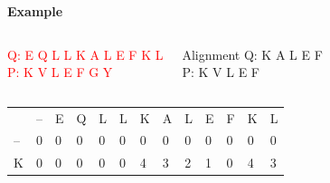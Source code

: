 \documentclass{bredelebeamer}
\begin{document}
\begin{frame}
    \centering
  \begin{Large}
   \textbf{Example} \linebreak
  \end{Large}
\begin{columns}
\textcolor{red}{Q:  E Q L L K A L E F K L \\
P:  K V L E F G Y}

\begin{block}{Alignment}
Q:  K A L E F \\
P:  K V L E F
\end{block}
\end{columns}
  
\begin{table}[]
\centering
\begin{tabular}{lllllllllllll}
                        & --                     & E                      & Q                      & L                      & L                                              & K                                              & A                                              & L                                              & E                                               & F                                               & K                       & L                       \\ \cline{2-13} 
\multicolumn{1}{l|}{--} & \multicolumn{1}{l|}{0} & \multicolumn{1}{l|}{0} & \multicolumn{1}{l|}{0} & \multicolumn{1}{l|}{0} & \multicolumn{1}{l|}{\cellcolor[HTML]{3166FF}0} & \multicolumn{1}{l|}{0}                         & \multicolumn{1}{l|}{0}                         & \multicolumn{1}{l|}{0}                         & \multicolumn{1}{l|}{0}                          & \multicolumn{1}{l|}{0}                          & \multicolumn{1}{l|}{0}  & \multicolumn{1}{l|}{0}  \\ \cline{2-13} 
\multicolumn{1}{l|}{K}  & \multicolumn{1}{l|}{0} & \multicolumn{1}{l|}{0} & \multicolumn{1}{l|}{0} & \multicolumn{1}{l|}{0} & \multicolumn{1}{l|}{0}                         & \multicolumn{1}{l|}{\cellcolor[HTML]{3166FF}4} & \multicolumn{1}{l|}{\cellcolor[HTML]{EFEFEF}3} & \multicolumn{1}{l|}{2}                         & \multicolumn{1}{l|}{1}                          & \multicolumn{1}{l|}{0}                          & \multicolumn{1}{l|}{4}  & \multicolumn{1}{l|}{3}  \\ \cline{2-13} 

\end{tabular}
\end{table}
\end{frame}
\end{document}
